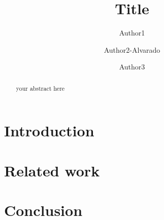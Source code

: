 \documentclass[runningheads,a4paper]{llncs}
\begin{document}
\title{Title}

\author{Author1 \and Author2\--Alvarado \and Author3}
		
			
\maketitle

\begin{abstract}
your abstract here
\end{abstract}

\section{Introduction}
\label{sec:introduction}


\section{Related work}
\label{sec:relatedwork}



\section{Conclusion}
\label{sec:conclusion}




\end{document}
